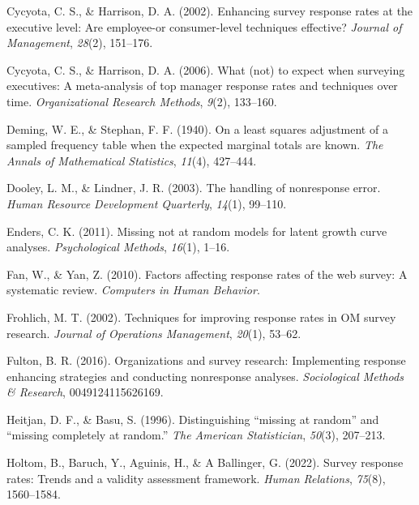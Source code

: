 \documentclass[
  man,mask]{apa7}
\newlength{\cslhangindent}
\newenvironment{CSLReferences}[2] %
 {\begin{list}{}{%
  \setlength{\itemindent}{0pt}
  \setlength{\leftmargin}{0pt}
  \setlength{\parsep}{0pt}
  \ifodd #1
   \setlength{\leftmargin}{\cslhangindent}
   \setlength{\itemindent}{-1\cslhangindent}
  \fi
  \setlength{\itemsep}{#2\baselineskip}}}
 {\end{list}}
\begin{document}
\begin{CSLReferences}{1}{0}
Cycyota, C. S., \& Harrison, D. A. (2002). Enhancing survey response rates at the executive level: Are employee-or consumer-level techniques effective? \emph{Journal of Management}, \emph{28}(2), 151--176.

Cycyota, C. S., \& Harrison, D. A. (2006). What (not) to expect when surveying executives: A meta-analysis of top manager response rates and techniques over time. \emph{Organizational Research Methods}, \emph{9}(2), 133--160.

Deming, W. E., \& Stephan, F. F. (1940). On a least squares adjustment of a sampled frequency table when the expected marginal totals are known. \emph{The Annals of Mathematical Statistics}, \emph{11}(4), 427--444.

Dooley, L. M., \& Lindner, J. R. (2003). The handling of nonresponse error. \emph{Human Resource Development Quarterly}, \emph{14}(1), 99--110.

Enders, C. K. (2011). Missing not at random models for latent growth curve analyses. \emph{Psychological Methods}, \emph{16}(1), 1--16.

Fan, W., \& Yan, Z. (2010). Factors affecting response rates of the web survey: A systematic review. \emph{Computers in Human Behavior}.

Frohlich, M. T. (2002). Techniques for improving response rates in {OM} survey research. \emph{Journal of Operations Management}, \emph{20}(1), 53--62.

Fulton, B. R. (2016). Organizations and survey research: Implementing response enhancing strategies and conducting nonresponse analyses. \emph{Sociological Methods \& Research}, 0049124115626169.

Heitjan, D. F., \& Basu, S. (1996). Distinguishing {``missing at random''} and {``missing completely at random.''} \emph{The American Statistician}, \emph{50}(3), 207--213.

Holtom, B., Baruch, Y., Aguinis, H., \& A Ballinger, G. (2022). Survey response rates: Trends and a validity assessment framework. \emph{Human Relations}, \emph{75}(8), 1560--1584.


\end{CSLReferences}
\end{document}
